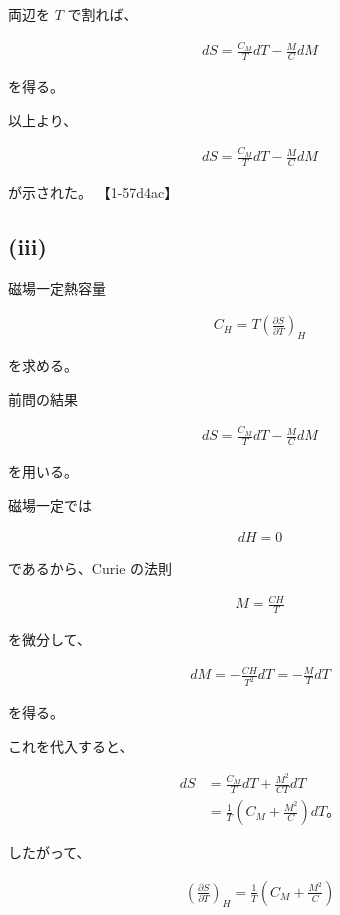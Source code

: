 \documentclass[platex,dvipdfmx,a4paper]{jsarticle}
\begin{document}
両辺を $T$ で割れば、

\begin{align*}
dS
=
\frac{C_M}{T}dT
-
\frac{M}{C}dM
\end{align*}

を得る。

以上より、

\begin{align*}
dS
=
\frac{C_M}{T}dT
-
\frac{M}{C}dM
\end{align*}

が示された。 【1-57d4ac】

\subsection{(iii)}

磁場一定熱容量

\begin{align*}
C_H
=
T
\left(
\frac{\partial S}{\partial T}
\right)_H
\end{align*}

を求める。

前問の結果

\begin{align*}
dS
=
\frac{C_M}{T}dT
-
\frac{M}{C}dM
\end{align*}

を用いる。

磁場一定では

\begin{align*}
dH=0
\end{align*}

であるから、Curie の法則

\begin{align*}
M=\frac{CH}{T}
\end{align*}

を微分して、

\begin{align*}
dM
=
-\frac{CH}{T^2}dT
=
-\frac{M}{T}dT
\end{align*}

を得る。

これを代入すると、

\begin{align*}
dS
&=
\frac{C_M}{T}dT
+
\frac{M^2}{CT}dT \\
&=
\frac{1}{T}
\left(
C_M+\frac{M^2}{C}
\right)dT。
\end{align*}

したがって、

\begin{align*}
\left(
\frac{\partial S}{\partial T}
\right)_H
=
\frac{1}{T}
\left(
C_M+\frac{M^2}{C}
\right)
\end{align*}
\end{document}
